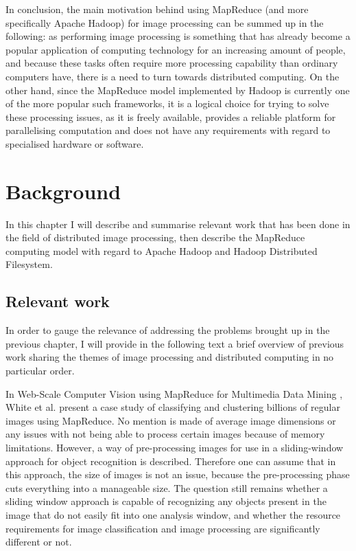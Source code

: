 \documentclass [12pt,a4paper]{report}
\begin{document}
In conclusion, the main motivation behind using MapReduce (and more specifically Apache Hadoop) for image processing can be summed up in the following: as performing image processing is something that has already become a popular application of computing technology for an increasing amount of people, and because these tasks often require more processing capability than ordinary computers have, there is a need to turn towards distributed computing. On the other hand, since the MapReduce model implemented by Hadoop is currently one of the more popular such frameworks, it is a logical choice for trying to solve these processing issues, as it is freely available, provides a reliable platform for parallelising computation and does not have any requirements with regard to specialised hardware or software.

\chapter{Background}

In this chapter I will describe and summarise relevant work that has been done in the field of distributed image processing, then describe the MapReduce computing model with regard to Apache Hadoop and Hadoop Distributed Filesystem.

\section{Relevant work}

In order to gauge the relevance of addressing the problems brought up in the previous chapter, I will provide in the following text a brief overview of previous work sharing the themes of image processing and distributed computing in no particular order. 

In Web-Scale Computer Vision using MapReduce for Multimedia Data Mining \cite{White:2010:WCV:1814245.1814254}, White et al. present a case study of classifying and clustering billions of regular images using MapReduce. No mention is made of average image dimensions or any issues with not being able to process certain images because of memory limitations. However, a way of pre-processing images for use in a sliding-window approach for object recognition is described. Therefore one can assume that in this approach, the size of images is not an issue, because the pre-processing phase cuts everything into a manageable size. The question still remains whether a sliding window approach is capable of recognizing any objects present in the image that do not easily fit into one analysis window, and whether the resource requirements for image classification and image processing are significantly different or not.
\end{document}
